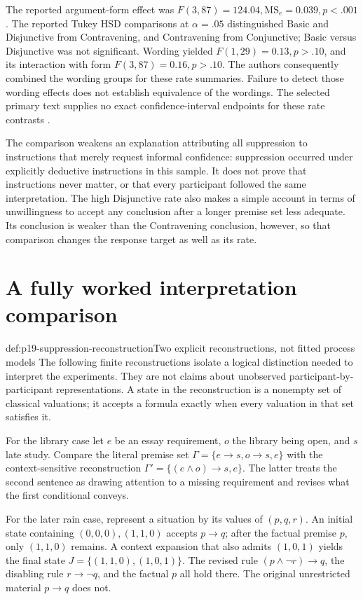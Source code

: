 The reported argument-form effect was
\(F(3,87)=124.04,\mathrm{MS}_e=0.039,p<.001\).
The reported Tukey HSD comparisons at \(\alpha=.05\) distinguished
Basic and Disjunctive from Contravening, and Contravening from Conjunctive;
Basic versus Disjunctive was not significant. Wording yielded
\(F(1,29)=0.13,p>.10\), and its interaction with form
\(F(3,87)=0.16,p>.10\). The authors consequently combined the wording
groups for these rate summaries. Failure to detect those wording effects
does not establish equivalence of the wordings. The selected primary
text supplies no exact confidence-interval endpoints for these rate
contrasts \cite[Secs.~5.1--5.2]{CarianiRips2017Suppression}.

The comparison weakens an explanation attributing all suppression to
instructions that merely request informal confidence: suppression occurred
under explicitly deductive instructions in this sample. It does not prove
that instructions never matter, or that every participant followed the
same interpretation. The high Disjunctive rate also makes a simple account
in terms of unwillingness to accept any conclusion after a longer premise
set less adequate. Its conclusion is weaker than the Contravening
conclusion, however, so that comparison changes the response target as
well as its rate.

\section{A fully worked interpretation comparison}
\label{sec:p19-suppression-reconstruction}

\begin{hbdefinition}{def:p19-suppression-reconstruction}{Two explicit reconstructions, not fitted process models}
The following finite reconstructions isolate a logical distinction needed
to interpret the experiments. They are not claims about unobserved
participant-by-participant representations.
A state in the reconstruction is a nonempty set of classical valuations;
it accepts a formula exactly when every valuation in that set satisfies it.

For the library case let \(e\) be an essay requirement, \(o\) the library
being open, and \(s\) late study. Compare the literal premise set
\(\Gamma=\{e\to s,o\to s,e\}\) with the context-sensitive
reconstruction \(\Gamma'=\{(e\land o)\to s,e\}\).
The latter treats the second sentence as drawing attention to a missing
requirement and revises what the first conditional conveys.

For the later rain case, represent a situation by its values of
\((p,q,r)\). An initial state containing
\((0,0,0),(1,1,0)\) accepts \(p\to q\); after the factual premise
\(p\), only \((1,1,0)\) remains. A context expansion that also admits
\((1,0,1)\) yields the final state
\(J=\{(1,1,0),(1,0,1)\}\). The revised rule
\((p\land\neg r)\to q\), the disabling rule \(r\to\neg q\), and
the factual \(p\) all hold there. The original unrestricted material
\(p\to q\) does not.
\end{hbdefinition}

